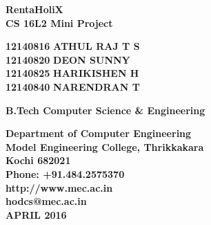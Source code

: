 \documentclass[11pt]{report}
\begin{document}
\begin{titlepage}
\begin{center}

\Huge{\textbf{RentaHoliX}}\\
\vspace{0.05in}
\large{\textbf{CS 16L2 Mini Project\\}}
\vspace{1.2in}



\begin{center}

\Large{\textbf{12140816}}  \Large{\textbf{ATHUL RAJ T S}}\\ 
\Large{\textbf{12140820}}  \Large{\textbf{DEON SUNNY}}\\ 
\Large{\textbf{12140825}}  \Large{\textbf{HARIKISHEN H}}\\
\Large{\textbf{12140840}}  \Large{\textbf{NARENDRAN T}}\\

\end{center}

\Large{\textbf{
B.Tech Computer Science \& Engineering
}}


\vspace{2.0in}
\begin{figure}[h]
\begin{center}

\end{center}
\end{figure}
\textbf{
Department of Computer Engineering\\
Model Engineering College, Thrikkakara\\
Kochi 682021\\
Phone: +91.484.2575370\\
http://www.mec.ac.in\\
hodcs@mec.ac.in\\
\vspace{0in}
{\footnotesize APRIL 2016}
}
\end{center}
\end{titlepage}



\end{document}

